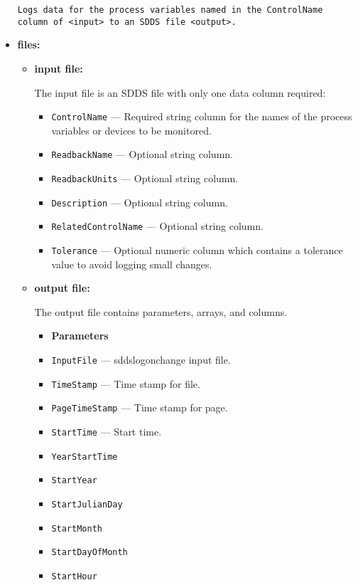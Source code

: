 \begin{itemize}
\begin{verbatim}
Logs data for the process variables named in the ControlName
column of <input> to an SDDS file <output>.
\end{verbatim}
\item {\bf files:}
\begin{itemize}
\item {\bf input file:}\par
The input file is an SDDS file with only one data column required:
\begin{itemize}
        \item {\tt ControlName} --- Required string column for the names of the process variables or devices to be monitored.
        \item {\tt ReadbackName} --- Optional string column.
        \item {\tt ReadbackUnits} --- Optional string column.
        \item {\tt Description} --- Optional string column.
        \item {\tt RelatedControlName} --- Optional string column.
        \item {\tt Tolerance} --- Optional numeric column which contains a tolerance value to avoid logging small changes.
\end{itemize}

\item {\bf output file:}\par
The output file contains parameters, arrays, and columns.
\begin{itemize}
        \item {\bf Parameters}
        \item {\tt InputFile} --- sddslogonchange input file.
        \item {\tt TimeStamp} --- Time stamp for file.
        \item {\tt PageTimeStamp} --- Time stamp for page.
        \item {\tt StartTime} --- Start time.
        \item {\tt YearStartTime}
        \item {\tt StartYear}
        \item {\tt StartJulianDay}
        \item {\tt StartMonth}
        \item {\tt StartDayOfMonth}
        \item {\tt StartHour}
\end{itemize}
\begin{verbatim}


\end{verbatim}
\end{itemize}
\end{itemize}
